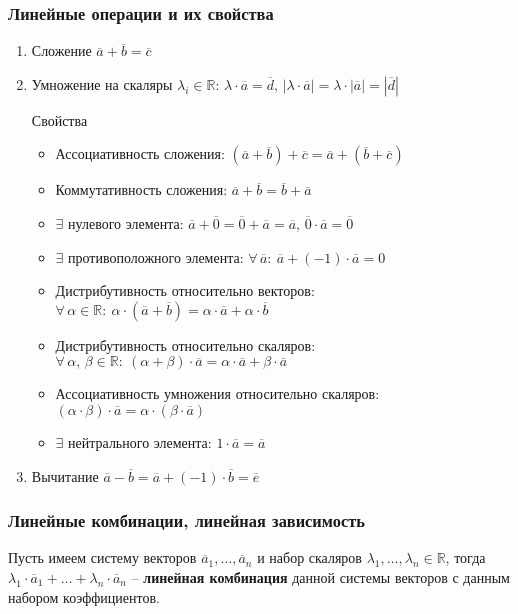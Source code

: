 \documentclass{article}
\newcommand{\R}{\mathbb R}
\begin{document}
\subsubsection{Линейные операции и их свойства}
\begin{enumerate}
    \item Сложение $\overline{a}+\overline{b}=\overline{c}$
    \item Умножение на скаляры $\lambda_i\in\R$: $\lambda\cdot\overline{a}=\overline{d},\,|\lambda\cdot\overline{a}|=\lambda\cdot|\overline{a}|=|\overline{d}|$

    Свойства
    \begin{itemize}
        \item Ассоциативность сложения: $(\overline{a}+\overline{b})+\overline{c}=\overline{a}+(\overline{b}+\overline{c})$
        \item Коммутативность сложения: $\overline{a}+\overline{b}=\overline{b}+\overline{a}$
        \item $\exists$ нулевого элемента: $\overline{a}+\overline{0}=\overline{0}+\overline{a}=\overline{a}$, $\overline{0}\cdot\overline{a}=\overline{0}$
        \item $\exists$ противоположного элемента: $\forall\,\overline{a}:\:\overline{a}+(-1)\cdot\overline{a}=0$
        \item Дистрибутивность относительно векторов: $\forall\,\alpha\in\R:\:\alpha\cdot(\overline{a}+\overline{b})=\alpha\cdot\overline{a}+\alpha\cdot\overline{b}$
        \item Дистрибутивность относительно скаляров: $\forall\,\alpha,\,\beta\in\R:\:(\alpha+\beta)\cdot\overline{a}=\alpha\cdot\overline{a}+\beta\cdot\overline{a}$
        \item Ассоциативность умножения относительно скаляров: $(\alpha\cdot\beta)\cdot\overline{a}=\alpha\cdot(\beta\cdot\overline{a})$
    \item $\exists$ нейтрального элемента:    $1\cdot\overline{a}=\overline{a}$
    \end{itemize}
    \item Вычитание $\overline{a}-\overline{b}=\overline{a}+(-1)\cdot\overline{b}=\overline{e}$

\end{enumerate}
\subsubsection{Линейные комбинации, линейная зависимость}
Пусть имеем систему векторов $\overline{a}_1,\ldots,\overline{a}_n$ и набор скаляров $\lambda_1,\ldots,\lambda_n\in\R$, тогда $\lambda_1\cdot\overline{a}_1+\ldots+\lambda_n\cdot\overline{a}_n$ -- \textbf{линейная комбинация} данной системы векторов с данным набором коэффициентов.
\end{document}

